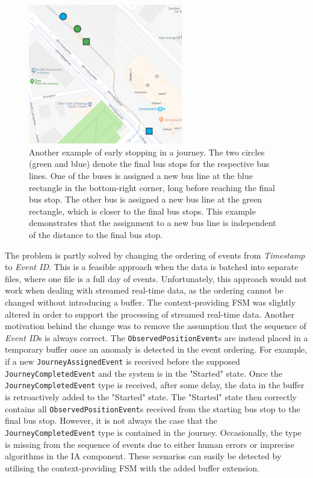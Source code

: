 \begin{figure}[t]
    \centering
    \includegraphics[width=0.6\textwidth]{figures/assigned_completed_problem}
    \caption[Another example of early stopping in a journey]
    {\small Another example of early stopping in a journey.
    The two circles (green and blue) denote the final bus stops for the respective bus lines.
    One of the buses is assigned a new bus line at the blue rectangle in the bottom-right corner, long before reaching the final bus stop.
    The other bus is assigned a new bus line at the green rectangle, which is closer to the final bus stops.
    This example demonstrates that the assignment to a new bus line is independent of the distance to the final bus stop.}
    \label{fig:assigned-before-completed}
\end{figure}

The problem is partly solved by changing the ordering of events from \textit{Timestamp} to \textit{Event ID}.
This is a feasible approach when the data is batched into separate files, where one file is a full day of events.
Unfortunately, this approach would not work when dealing with streamed real-time data, as the ordering cannot be changed without introducing a buffer.
The context-providing FSM was slightly altered in order to support the processing of streamed real-time data.
Another motivation behind the change was to remove the assumption that the sequence of \textit{Event ID}s is always correct. 
The \texttt{ObservedPositionEvent}s are instead placed in a temporary buffer once an anomaly is detected in the event ordering.
For example, if a new \texttt{JourneyAssignedEvent} is received before the supposed \texttt{JourneyCompletedEvent} and the system is in the "Started" state.
Once the \texttt{JourneyCompletedEvent} type is received, after some delay, the data in the buffer is retroactively added to the "Started" state.
The "Started" state then correctly contains all \texttt{ObservedPositionEvent}s received from the starting bus stop to the final bus stop.
However, it is not always the case that the \texttt{JourneyCompletedEvent} type is contained in the journey.
Occasionally, the type is missing from the sequence of events due to either human errors or imprecise algorithms in the IA component.
These scenarios can easily be detected by utilising the context-providing FSM with the added buffer extension.

